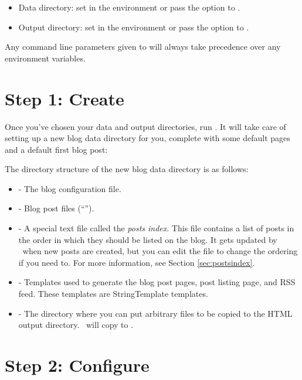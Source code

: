 \documentclass[11pt, letterpaper, oneside, titlepage]{book}
\begin{document}
\begin{itemize}
\item{Data directory: set  in the environment or pass
	the  option to .}
\item{Output directory: set  in the environment or
	pass the  option to .}
\end{itemize}

Any command line parameters given to  will always take
precedence over any environment variables.

\section{Step 1: Create}

Once you've chosen your data and output directories, run .
It will take care of setting up a new blog data directory for you,
complete with some default pages and a default first blog post:


The directory structure of the new blog data directory is as follows:

\begin{itemize}
\item{ - The blog configuration file.}
\item{ - Blog post files (``'').}
\item{ - A special text file called the
  \textit{posts index}.  This file contains a list of posts in the
  order in which they should be listed on the blog.  It gets updated
  by \mathblog\ when new posts are created, but you can edit the file
  to change the ordering if you need to.  For more information, see
  Section \ref{sec:postsindex}.}
\item{ - Templates used to generate the blog post
  pages, post listing page, and RSS feed.  These templates are
  StringTemplate templates.}
\item{ - The directory where you can put arbitrary files
  to be copied to the HTML output directory.  \mathblog\ will copy
   to .}
\end{itemize}

\section{Step 2: Configure}
\label{sec:configuration}
\end{document}

